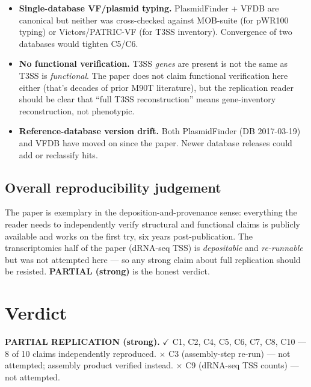 \documentclass[11pt]{article}
\begin{document}
\begin{itemize}[nosep]
  \item \textbf{Single-database VF/plasmid typing.} PlasmidFinder + VFDB are canonical but neither
    was cross-checked against MOB-suite (for pWR100 typing) or Victors/PATRIC-VF (for T3SS
    inventory). Convergence of two databases would tighten C5/C6.
  \item \textbf{No functional verification.} T3SS \textit{genes} are present is not the same as
    T3SS is \textit{functional}. The paper does not claim functional verification here either
    (that's decades of prior M90T literature), but the replication reader should be clear that
    ``full T3SS reconstruction'' means gene-inventory reconstruction, not phenotypic.
  \item \textbf{Reference-database version drift.} Both PlasmidFinder (DB 2017-03-19) and VFDB
    have moved on since the paper. Newer database releases could add or reclassify hits.
\end{itemize}

\subsection{Overall reproducibility judgement}

The paper is exemplary in the deposition-and-provenance sense: everything the reader needs to
independently verify structural and functional claims is publicly available and works on the
first try, six years post-publication. The transcriptomics half of the paper (dRNA-seq TSS) is
\textit{depositable} and \textit{re-runnable} but was not attempted here --- so any strong claim
about full replication should be resisted. \textbf{PARTIAL (strong)} is the honest verdict.

\section{Verdict}

\textbf{PARTIAL REPLICATION (strong).}
$\checkmark$ C1, C2, C4, C5, C6, C7, C8, C10 --- 8 of 10 claims independently reproduced.
$\times$ C3 (assembly-step re-run) --- not attempted; assembly product verified instead.
$\times$ C9 (dRNA-seq TSS counts) --- not attempted.
\end{document}
